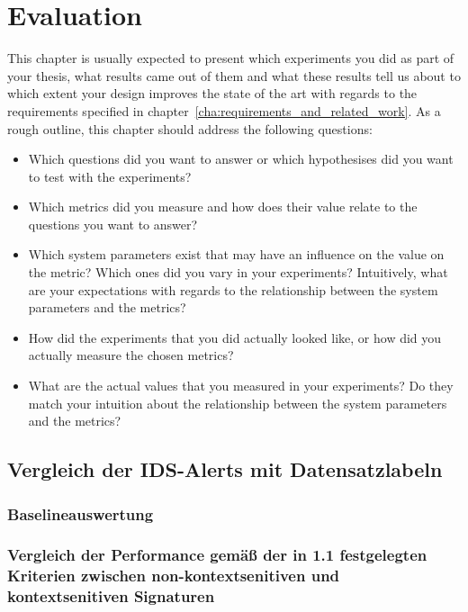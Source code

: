 \chapter{Evaluation}%
\label{cha:evaluation}

This chapter is usually expected to present which experiments you did as part of your thesis, what results came out of them and what these results tell us about to which extent your design improves the state of the art with regards to the requirements specified in chapter~\ref{cha:requirements_and_related_work}.
As a rough outline, this chapter should address the following questions:
\begin{itemize}
   \item Which questions did you want to answer or which hypothesises did you want to test with the experiments?
   \item Which metrics did you measure and how does their value relate to the questions you want to answer?
   \item Which system parameters exist that may have an influence on the value on the metric? Which ones did you vary in your experiments? Intuitively, what are your expectations with regards to the relationship between the system parameters and the metrics?
   \item How did the experiments that you did actually looked like, or how did you actually measure the chosen metrics?
   \item What are the actual values that you measured in your experiments? Do they match your intuition about the relationship between the system parameters and the metrics?
\end{itemize}

\section{ Vergleich der IDS-Alerts mit Datensatzlabeln}
\subsection{ Baselineauswertung } 
\subsection{ Vergleich der Performance gemäß der in 1.1 festgelegten Kriterien zwischen non-kontextsenitiven und kontextsenitiven Signaturen} 
